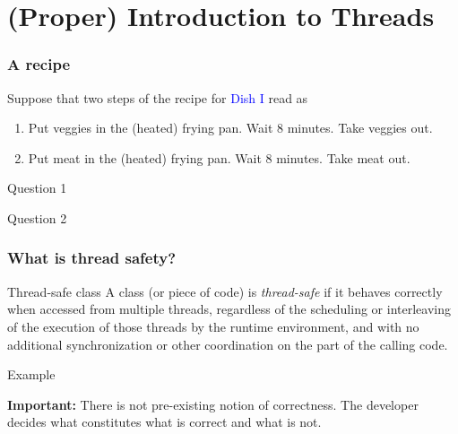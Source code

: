\documentclass[xcolor={dvipsnames,svgnames},aspectratio=169]{beamer}
\begin{document}
\section{(Proper) Introduction to Threads}

\begin{frame}[fragile]
  \frametitle{A recipe}

  Suppose that two steps of the recipe for \textcolor{blue}{Dish I} read as
  \begin{enumerate}
    \item Put veggies in the (heated) frying pan. Wait 8 minutes. Take veggies
      out.
    \item Put meat in the (heated) frying pan. Wait 8 minutes. Take meat out.
    \end{enumerate}
    \vspace{0.6cm}
    \begin{block}{Question 1}
    \end{block}
    \begin{block}{Question 2}
    \end{block}
\end{frame}

\begin{frame}[fragile]
  \frametitle{What is thread safety?}

  \begin{block}{Thread-safe class}
    A class (or piece of code) is \emph{thread-safe} if it behaves correctly
    when accessed from multiple threads, regardless of the scheduling or
    interleaving of the execution of those threads by the runtime environment,
    and with no additional synchronization or other coordination on the part of
    the calling code.
  \end{block}

  \vspace{1cm}
  \begin{block}{Example}
  \end{block}
\end{frame}

\begin{frame}[fragile]
  \large{\textbf{Important:} There is not pre-existing notion of correctness.
    The developer decides what constitutes what is correct and what is not.}
\end{frame}
\end{document}
